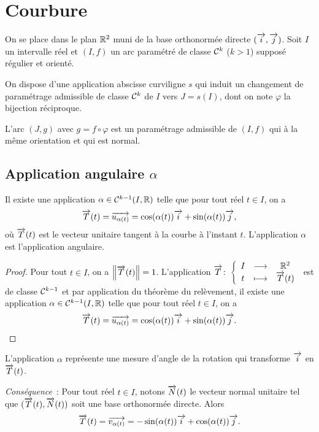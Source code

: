 \section{Courbure}

On se place dans le plan $\mathbb{R}^2$ muni de la base orthonormée directe $(\overrightarrow{i}, \overrightarrow{j})$. Soit $I$ un intervalle réel et $(I,f)$ un arc paramétré de classe $\mathcal{C}^{k}$ ($k>1$) supposé régulier et orienté. 

On dispose d'une application abscisse curviligne $s$ qui induit un changement de paramétrage admissible de classe $\mathcal{C}^{k}$ de $I$ vers $J=s(I)$, dont on note $\varphi$ la bijection réciproque.

L'arc $(J, g)$ avec $g=f \circ \varphi$ est un paramétrage admissible de $(I,f)$ qui à la même orientation et qui est normal.

\subsection{Application angulaire $\alpha$}

\begin{prop}
  Il existe une application $\alpha \in \mathcal{C}^{k-1}(I, \mathbb{R})$ telle que pour tout réel $t \in I$, on a
  \begin{equation}
    \overrightarrow{T}(t) = \overrightarrow{u_{\alpha(t)}} = \cos(\alpha(t)) \overrightarrow{i} + \sin(\alpha(t)) \overrightarrow{j},
  \end{equation}
  où $\overrightarrow{T}(t)$ est le vecteur unitaire tangent à la courbe à l'instant $t$. L'application $\alpha$ est l'application angulaire.
\end{prop}
\begin{proof}
  Pour tout $t \in I$, on a $\left\lVert\overrightarrow{T}(t)\right\rVert=1$. L'application $\overrightarrow{T}\colon \left\{\begin{array}{ccc} I & \longrightarrow &\mathbb{R}^2\\ t & \longmapsto & \overrightarrow{T}(t) \end{array} \right.$ est de classe $\mathcal{C}^{k-1}$ et par application du théorème du relèvement, il existe une application $\alpha \in \mathcal{C}^{k-1}(I, \mathbb{R})$ telle que pour tout réel $t \in I$, on a
  \begin{equation}
    \overrightarrow{T}(t) = \overrightarrow{u_{\alpha(t)}} = \cos(\alpha(t)) \overrightarrow{i} + \sin(\alpha(t)) \overrightarrow{j}.
  \end{equation}
\end{proof}

L'application $\alpha$ représente une mesure d'angle de la rotation qui transforme $\overrightarrow{i}$ en $\overrightarrow{T}(t)$.

\emph{Conséquence}~: Pour tout réel $t \in I$, notons $\overrightarrow{N}(t)$ le vecteur normal unitaire tel que $(\overrightarrow{T}(t), \overrightarrow{N}(t))$ soit une base orthonormée directe. Alors 
\begin{equation}
  \overrightarrow{T}(t) = \overrightarrow{v_{\alpha(t)}} = -\sin(\alpha(t)) \overrightarrow{i} + \cos(\alpha(t)) \overrightarrow{j}.
\end{equation}

